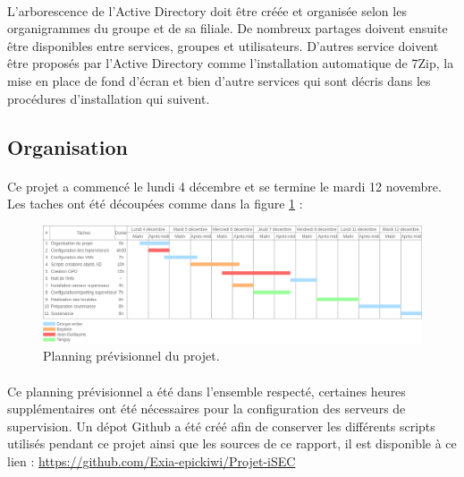 		\paragraph{}	
			L'arborescence de l'Active Directory doit être créée et organisée selon les organigrammes du groupe et de sa filiale. De nombreux partages doivent ensuite être disponibles entre services, groupes et utilisateurs. D'autres service doivent être proposés par l'Active Directory comme l'installation automatique de 7Zip, la mise en place de fond d'écran et bien d'autre services qui sont décris dans les procédures d'installation qui suivent.
	\subsection{Organisation}
		\paragraph{}
			Ce projet a commencé le lundi 4 décembre et se termine le mardi 12 novembre. Les taches ont été découpées comme dans la figure \ref{planning} :

			\begin{figure}[h]
				\centering
				\includegraphics[scale=0.50]{Presentation/img/Planning_previsio.png}
				\caption{Planning prévisionnel du projet.}
				\label{planning}
			\end{figure} 

		\paragraph{}
			Ce planning prévisionnel a été dans l'ensemble respecté, certaines heures supplémentaires ont été nécessaires pour la configuration des serveurs de supervision. Un dépot Github a été créé afin de conserver les différents scripts utilisés pendant ce projet ainsi que les sources de ce rapport, il est disponible à ce lien : \href{https://github.com/Exia-epickiwi/Projet-iSEC}{https://github.com/Exia-epickiwi/Projet-iSEC}
